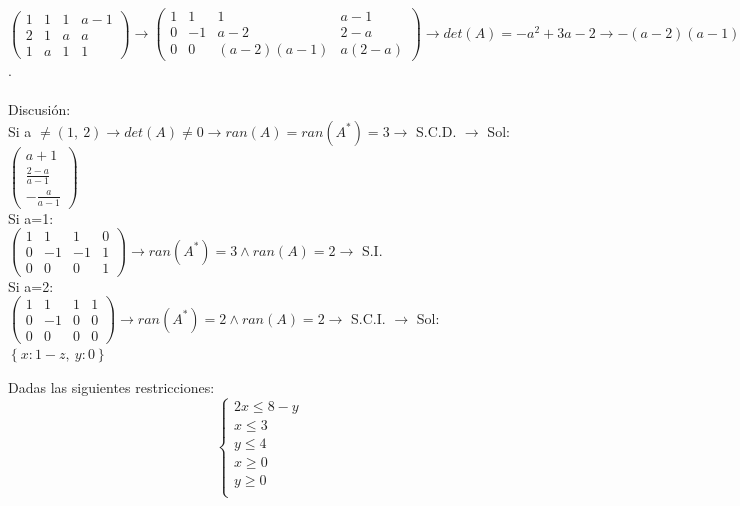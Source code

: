 \documentclass[addpoints,spanish, 12pt,a4paper]{exam}
\begin{document}
\begin{questions}
\begin{parts}


\end{parts}
\begin{solution}
$\left(\begin{matrix}1 & 1 & 1 & a - 1\\2 & 1 & a & a\\1 & a & 1 & 1\end{matrix}\right) \to \left(\begin{matrix}1 & 1 & 1 & a - 1\\0 & -1 & a - 2 & 2 - a\\0 & 0 & \left(a - 2\right) \left(a - 1\right) & a \left(2 - a\right)\end{matrix}\right)\to det(A)=- a^{2} + 3 a - 2\to- \left(a - 2\right) \left(a - 1\right)$. \\ \\ Discusión: \\Si a $\neq\left( 1, \  2\right)\to det(A) \neq 0 \to ran(A)=ran(A^*)=3 \to $ S.C.D. $\to$ Sol:$\left(\begin{matrix}a + 1\\\frac{2 - a}{a - 1}\\- \frac{a}{a - 1}\end{matrix}\right)$ \\Si a=1: \\ $\left(\begin{matrix}1 & 1 & 1 & 0\\0 & -1 & -1 & 1\\0 & 0 & 0 & 1\end{matrix}\right) \to ran(A^*)=3 \land ran(A)=2 \to$  S.I. \\Si a=2: \\ $\left(\begin{matrix}1 & 1 & 1 & 1\\0 & -1 & 0 & 0\\0 & 0 & 0 & 0\end{matrix}\right) \to ran(A^*)=2 \land ran(A)=2 \to$  S.C.I.  $\to$ Sol:$\left\{ x : 1 - z, \  y : 0\right\}$
\end{solution}
\addpoints



\question Dadas las siguientes restricciones: $$\left\{\begin{matrix}
2x  \leqslant  8 - y\\
x  \leqslant  3\\
y  \leqslant  4\\
x  \geqslant  0 \\
y  \geqslant  0 \\
\end{matrix}\right.$$ 


\end{questions}
\end{document}
